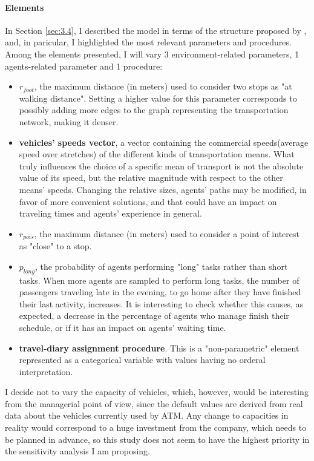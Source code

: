 \paragraph{Elements}
In Section \ref{sec:3.4}, I described the model in terms of the structure proposed by \textcite{Borgonovo2022SensitivityAO}, and, in paricular, I highlighted the most relevant parameters and procedures. Among the elements presented, I will vary 3 environment-related parameters, 1 agents-related parameter and 1 procedure:
\begin{itemize}
    \item \textbf{$r_{foot}$}, the maximum distance (in meters) used to consider two stops as "at walking distance". Setting a higher value for this parameter corresponds to possibly adding more edges to the graph representing the transportation network, making it denser.
    \item \textbf{vehicles' speeds vector}, a vector containing the commercial speeds(average speed over stretches) of the different kinds of transportation means. What truly influences the choice of a specific mean of transport is not the absolute value of its speed, but the relative magnitude with respect to the other means' speeds. Changing the relative sizes, agents' paths may be modified, in favor of more convenient solutions, and that could have an impact on traveling times and agents' experience in general.
    \item \textbf{$r_{pois}$}, the maximum distance (in meters) used to consider a point of interest as "close" to a stop. 
    \item \textbf{$p_{long}$}, the probability of agents performing "long" tasks rather than short tasks. When more agents are sampled to perform long tasks, the number of passengers traveling late in the evening, to go home after they have finished their last activity, increases. It is interesting to check whether this causes, as expected, a decrease in the percentage of agents who manage finish their schedule, or if it has an impact on agents' waiting time.
    \item \textbf{travel-diary assignment procedure}. This is a "non-parametric" element represented as a categorical variable with values having no orderal interpretation.
\end{itemize}
I decide not to vary the capacity of vehicles, which, however, would be interesting from the managerial point of view, since the default values are derived from real data about the vehicles currently used by ATM. Any change to capacities in reality would correspond to a huge investment from the company, which needs to be planned in advance, so this study does not seem to have the highest priority in the sensitivity analysis I am proposing.


